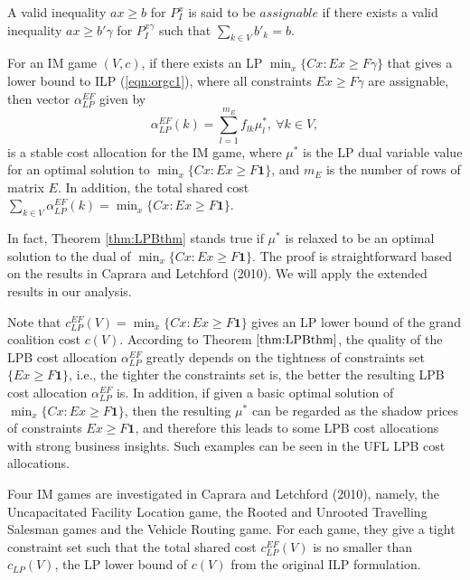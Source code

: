\documentclass[ijoc,nonblindrev]{informs3} %
\begin{document}
\begin{APPENDICES}
\begin{definition}
A valid inequality $ax \geq b$ for $P_I^x$ is said to be $assignable$ if there exists a valid inequality $ax \geq b'\gamma$ for $P_I^{x\gamma}$ such that $\sum_{k \in V}b'_k = b$.
\end{definition}


\begin{theorem}\label{thm:LPBthm}
For an IM game $(V,c)$, if there exists an LP $\min_{x} \{Cx:Ex \geq F\gamma\}$ that gives a lower bound to ILP (\ref{eqn:orgc1}), where all constraints $Ex \geq F\gamma$ are assignable, then vector $\alpha_{LP}^{EF}$ given by
\begin{equation*}\label{eqn:LPBca}
\alpha_{LP}^{EF}(k) = \sum_{l=1}^{m_E} f_{lk}\mu_l^*,~\forall k \in V,
\end{equation*}
is a stable cost allocation for the IM game, where $\mu^*$ is the LP dual variable value for an optimal solution to $\min_{x} \{Cx:Ex \geq F\textbf{1}\}$, and $m_E$ is the number of rows of matrix $E$.
In addition, the total shared cost $\sum_{k \in V}\alpha_{LP}^{EF}(k) = \min_{x} \{Cx:Ex \geq F\textbf{1}\}$.
\end{theorem}

In fact, Theorem \ref{thm:LPBthm} stands true if $\mu^*$ is relaxed to be an optimal solution to the dual of $\min_{x} \{Cx:Ex \geq F\textbf{1}\}$. The proof is straightforward based on the results in Caprara and Letchford (2010). We will apply the extended results in our analysis.

Note that $c_{LP}^{EF}(V)=\min_{x} \{Cx:Ex \geq F\textbf{1}\}$ gives an LP lower bound of the grand coalition cost $c(V)$.
According to Theorem $\ref{thm:LPBthm}$, the quality of the LPB cost allocation $\alpha_{LP}^{EF}$ greatly depends on the tightness of constraints set $\{Ex \geq F\textbf{1}\}$, i.e., the tighter the constraints set is, the better the resulting  LPB cost allocation $\alpha_{LP}^{EF}$ is. In addition, if given a basic optimal solution of $\min_{x} \{Cx:Ex \geq F\textbf{1}\}$, then the resulting $\mu^*$ can be regarded as the shadow prices of constraints $Ex \geq F\textbf{1}$, and therefore this leads to some LPB cost allocations with strong business insights. Such examples can be seen in the UFL LPB cost allocations.

Four IM games are investigated in Caprara and Letchford (2010), namely, the Uncapacitated Facility Location game, the Rooted and Unrooted Travelling Salesman games and the Vehicle Routing game. For each game, they give a tight constraint set such that the total shared cost $c_{LP}^{EF}(V)$ is no smaller than $c_{LP}(V)$, the LP lower bound of $c(V)$ from the original ILP formulation.





\end{APPENDICES}
\end{document}
